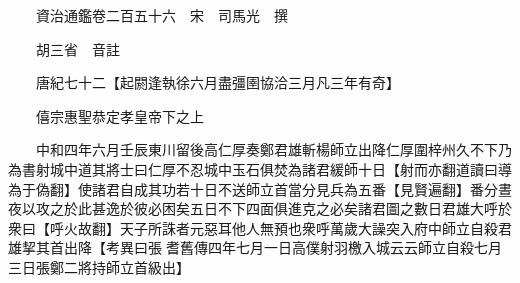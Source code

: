 










 


 
 


 

  
  
  
  
  





  
  
  
  
  
 
  

  

  
  
  



  

 
 

  
   




  

  
  


  　　資治通鑑卷二百五十六　宋　司馬光　撰

　　胡三省　音註

　　唐紀七十二【起閼逢執徐六月盡彊圉協洽三月凡三年有奇】

　　僖宗惠聖恭定孝皇帝下之上

　　中和四年六月壬辰東川留後高仁厚奏鄭君雄斬楊師立出降仁厚圍梓州久不下乃為書射城中道其將士曰仁厚不忍城中玉石俱焚為諸君緩師十日【射而亦翻道讀曰導為于偽翻】使諸君自成其功若十日不送師立首當分見兵為五番【見賢遍翻】番分晝夜以攻之於此甚逸於彼必困矣五日不下四面俱進克之必矣諸君圖之數日君雄大呼於衆曰【呼火故翻】天子所誅者元惡耳他人無預也衆呼萬歲大譟突入府中師立自殺君雄挈其首出降【考異曰張耆舊傳四年七月一日高僕射羽檄入城云云師立自殺七月三日張鄭二將持師立首級出】

